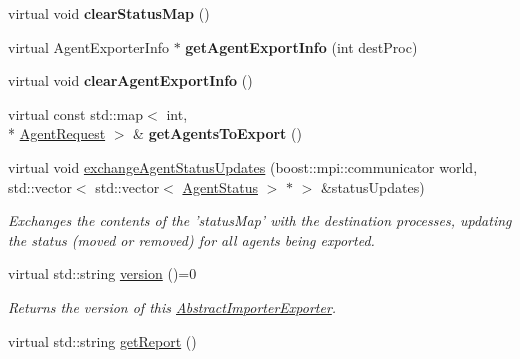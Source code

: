 \begin{DoxyCompactItemize}
\item 
\hypertarget{classrepast_1_1_abstract_importer_exporter_a007e8c17c3fa161f7ad1439074ed56d2}{virtual void {\bfseries clear\-Status\-Map} ()}\label{classrepast_1_1_abstract_importer_exporter_a007e8c17c3fa161f7ad1439074ed56d2}

\item 
\hypertarget{classrepast_1_1_abstract_importer_exporter_a402a82879f25681477af4d3665aa5f6d}{virtual Agent\-Exporter\-Info $\ast$ {\bfseries get\-Agent\-Export\-Info} (int dest\-Proc)}\label{classrepast_1_1_abstract_importer_exporter_a402a82879f25681477af4d3665aa5f6d}

\item 
\hypertarget{classrepast_1_1_abstract_importer_exporter_af83c0409da5354cb6a48641517e174f5}{virtual void {\bfseries clear\-Agent\-Export\-Info} ()}\label{classrepast_1_1_abstract_importer_exporter_af83c0409da5354cb6a48641517e174f5}

\item 
\hypertarget{classrepast_1_1_abstract_importer_exporter_aa88970b511ae80858bb67a9d825a5ba6}{virtual const std\-::map$<$ int, \\*
\hyperlink{classrepast_1_1_agent_request}{Agent\-Request} $>$ \& {\bfseries get\-Agents\-To\-Export} ()}\label{classrepast_1_1_abstract_importer_exporter_aa88970b511ae80858bb67a9d825a5ba6}

\item 
virtual void \hyperlink{classrepast_1_1_abstract_importer_exporter_a545aebe534629acb3061449351da289a}{exchange\-Agent\-Status\-Updates} (boost\-::mpi\-::communicator world, std\-::vector$<$ std\-::vector$<$ \hyperlink{classrepast_1_1_agent_status}{Agent\-Status} $>$ $\ast$ $>$ \&status\-Updates)
\begin{DoxyCompactList}\small\item\em Exchanges the contents of the 'status\-Map' with the destination processes, updating the status (moved or removed) for all agents being exported. \end{DoxyCompactList}\item 
virtual std\-::string \hyperlink{classrepast_1_1_abstract_importer_exporter_a27a52b5ec4ec41e3ed6bf1c8819c25fc}{version} ()=0
\begin{DoxyCompactList}\small\item\em Returns the version of this \hyperlink{classrepast_1_1_abstract_importer_exporter}{Abstract\-Importer\-Exporter}. \end{DoxyCompactList}\item 
\hypertarget{classrepast_1_1_abstract_importer_exporter_ab9cf2ceec7a25942ad964ae426c906c0}{virtual std\-::string \hyperlink{classrepast_1_1_abstract_importer_exporter_ab9cf2ceec7a25942ad964ae426c906c0}{get\-Report} ()}\label{classrepast_1_1_abstract_importer_exporter_ab9cf2ceec7a25942ad964ae426c906c0}


\end{DoxyCompactItemize}
